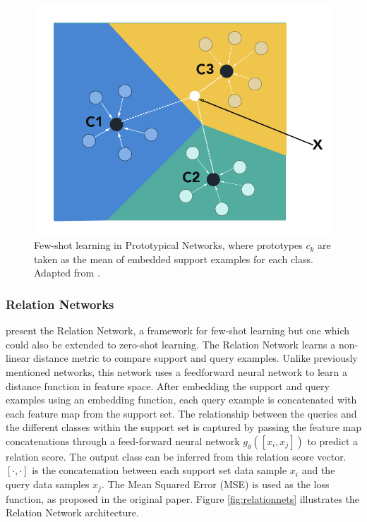 \begin{figure}[!ht]
    \centering
    \includegraphics[width=0.7\linewidth]{img/ProtoNetsAdapt.png}
    \caption{Few-shot learning in Prototypical Networks, where prototypes \textbf{$c_k$} are taken as the mean of embedded support examples for each class. Adapted from \citet{snell2017prototypical}.}
    \label{fig:protonets}
\end{figure}

\subsubsection{Relation Networks}

\citet{sung2018learning} present the Relation Network, a framework for few-shot learning but one which could also be extended to zero-shot learning. The Relation Network learns a non-linear distance metric to compare support and query examples. Unlike previously mentioned networks, this network uses a feedforward neural network to learn a distance function in feature space. After embedding the support and query examples using an embedding function, each query example is concatenated with each feature map from the support set. The relationship between the queries and the different classes within the support set is captured by passing the feature map concatenations through a feed-forward neural network $g_\theta([x_i, x_j])$ to predict a relation score. The output class can be inferred from this relation score vector. $[\cdot,\cdot]$ is the concatenation between each support set data sample $x_i$ and the query data samples $x_j$. The Mean Squared Error (MSE) is used as the loss function, as proposed in the original paper. Figure \ref{fig:relationnets} illustrates the Relation Network architecture.

